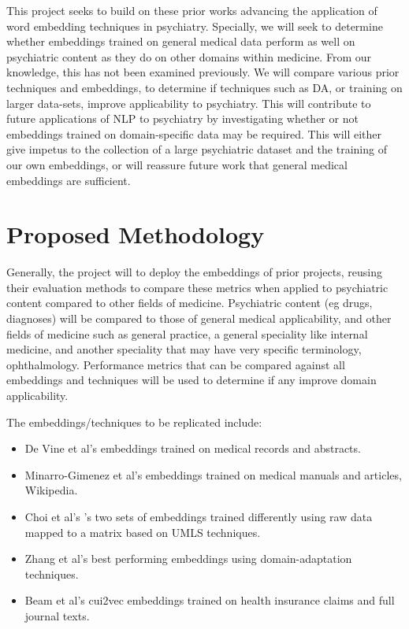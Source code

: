 \documentclass[10pt]{article}
\begin{document}
This project seeks to build on these prior works advancing the application of word embedding techniques in psychiatry. Specially, we will seek to determine whether embeddings trained on general medical data perform as well on psychiatric content as they do on other domains within medicine. From our knowledge, this has not been examined previously. We will compare various prior techniques and embeddings, to determine if techniques such as DA, or training on larger data-sets, improve applicability to psychiatry. This will contribute to future applications of NLP to psychiatry by investigating whether or not embeddings trained on domain-specific data may be required. This will either give impetus to the collection of a large psychiatric dataset and the training of our own embeddings, or will reassure future work that general medical embeddings are sufficient. 


\section{Proposed Methodology}

Generally, the project will to deploy the embeddings of prior projects, reusing their evaluation methods to compare these metrics when applied to psychiatric content compared to other fields of medicine. Psychiatric content (eg drugs, diagnoses) will be compared to those of general medical applicability, and other fields of medicine such as general practice, a general speciality like internal medicine, and another speciality that may have very specific terminology, ophthalmology. Performance metrics that can be compared against all embeddings and techniques will be used to determine if any improve domain applicability. 

The embeddings/techniques to be replicated include:
\begin{itemize}
	\item De Vine et al's  embeddings trained on medical records and abstracts.  
	\item Minarro-Gimenez et al's  embeddings trained on medical manuals and articles, Wikipedia.
	\item Choi et al's 's two sets of embeddings trained differently using raw data mapped to a matrix based on UMLS techniques.  
	\item Zhang et al's  best performing embeddings using domain-adaptation techniques. 
	\item Beam et al's cui2vec embeddings trained on health insurance claims and full journal texts. 
\end{itemize}
\end{document}
